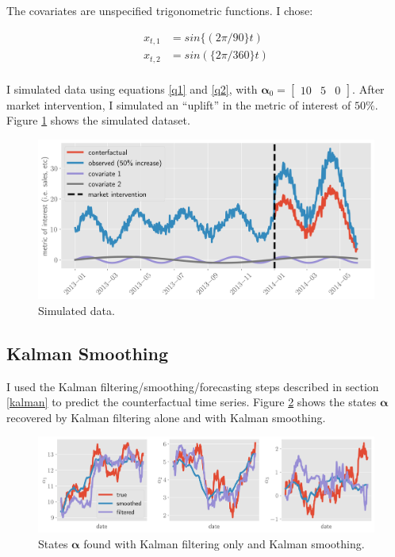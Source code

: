 \documentclass[12pt]{article}
\begin{document}
The covariates are unspecified trigonometric functions. I chose:

\begin{align*}
    x_{t, 1} &= sin\{(2\pi/90\}  t) \\
x_{t, 2} &= sin(\{2\pi/360\}  t)\\
\end{align*}

I simulated data using equations \ref{q1} and \ref{q2}, with $\boldsymbol{\alpha}_0 = \begin{bmatrix} 10 &5 & 0
\end{bmatrix} $. After market intervention, I simulated an ``uplift'' in the metric of interest of $50\%$. Figure \ref{data} shows the simulated dataset. 


\begin{figure}[!h]
    \centering
    \includegraphics[scale=.6
    ]{../figures/data.png}
    \caption{Simulated data.}
    \label{data}
\end{figure}




\subsection{Kalman Smoothing}
I used the Kalman filtering/smoothing/forecasting steps described in section \ref{kalman} to predict the counterfactual time series. Figure \ref{states} shows the states $\boldsymbol{\alpha}$ recovered by Kalman filtering alone and with Kalman smoothing.


\begin{figure}[!h]
    \centering
    \includegraphics[scale=.5
    ]{../figures/states.png}
    \caption{States $\boldsymbol{\alpha}$ found with Kalman filtering only and Kalman smoothing. }
    \label{states}
\end{figure}
\end{document}
